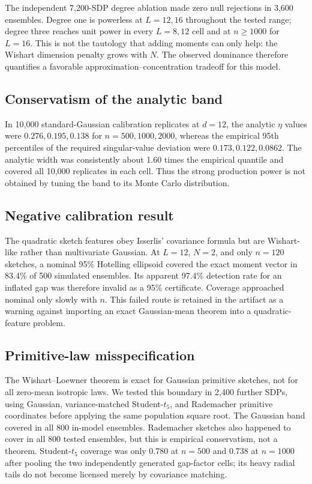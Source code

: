 \documentclass[11pt]{article}
\begin{document}
The independent 7,200-SDP degree ablation made zero null rejections in 3,600
ensembles.  Degree one is powerless at $L=12,16$ throughout the tested range;
degree three reaches unit power in every $L=8,12$ cell and at $n\ge1000$ for
$L=16$.  This is not the tautology that adding moments can only help: the
Wishart dimension penalty grows with $N$.  The observed dominance therefore
quantifies a favorable approximation--concentration tradeoff for this model.

\subsection{Conservatism of the analytic band}

In 10,000 standard-Gaussian calibration replicates at $d=12$, the analytic
$\eta$ values were $0.276,0.195,0.138$ for $n=500,1000,2000$, whereas the
empirical 95th percentiles of the required singular-value deviation were
$0.173,0.122,0.0862$.  The analytic width was consistently about 1.60 times
the empirical quantile and covered all 10,000 replicates in each cell.  Thus
the strong production power is not obtained by tuning the band to its Monte
Carlo distribution.

\subsection{Negative calibration result}

The quadratic sketch features obey Isserlis' covariance formula but are
Wishart-like rather than multivariate Gaussian.  At $L=12$, $N=2$, and only
$n=120$ sketches, a nominal 95\% Hotelling ellipsoid covered the exact moment
vector in 83.4\% of 500 simulated ensembles.  Its apparent 97.4\% detection
rate for an inflated gap was therefore invalid as a 95\% certificate.  Coverage
approached nominal only slowly with $n$.  This failed route is retained in the
artifact as a warning against importing an exact Gaussian-mean theorem into a
quadratic-feature problem.

\subsection{Primitive-law misspecification}

The Wishart--Loewner theorem is exact for Gaussian primitive sketches, not for
all zero-mean isotropic laws.  We tested this boundary in 2,400 further SDPs,
using Gaussian, variance-matched Student-$t_5$, and Rademacher primitive
coordinates before applying the same population square root.  The Gaussian
band covered in all 800 in-model ensembles.  Rademacher sketches also happened
to cover in all 800 tested ensembles, but this is empirical conservatism, not a
theorem.  Student-$t_5$ coverage was only 0.780 at $n=500$ and 0.738 at
$n=1000$ after pooling the two independently generated gap-factor cells; its
heavy radial tails do not become licensed merely by covariance matching.
\end{document}
